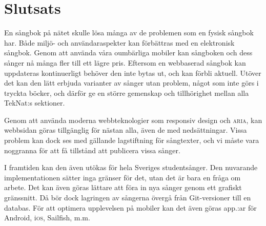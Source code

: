 \section{Slutsats}

En sångbok på nätet skulle lösa många av de problemen som en fysisk sångbok har. Både miljö- och användaraspekter kan förbättras med en elektronisk sångbok. Genom att använda våra oumbärliga mobiler kan sångboken och dess sånger nå många fler till ett lägre pris. Eftersom en webbaserad sångbok kan uppdateras kontinuerligt behöver den inte bytas ut, och kan förbli aktuell. Utöver det kan den lätt erbjuda varianter av sånger utan problem, något som inte görs i tryckta böcker, och därför ge en större gemenskap och tillhörighet mellan alla TekNat:s sektioner.

Genom att använda moderna webbteknologier som responsiv design och \textsc{aria}, kan webbsidan göras tillgänglig för nästan alla, även de med nedsättningar. Vissa problem kan dock ses med gällande lagstiftning för sångtexter, och vi måste vara noggranna för att få tillstånd att publicera vissa sånger.

I framtiden kan den även utökas för hela Sveriges studentsånger. Den nuvarande implementationen sätter inga gränser för det, utan det är bara en fråga om arbete. Det kan även göras lättare att föra in nya sånger genom ett grafiskt gränssnitt. Då bör dock lagringen av sångerna övergå från Git-versioner till en databas. För att optimera upplevelsen på mobiler kan det även göras app.:ar för Android, i\textsc{os}, Sailfish, m.m.
